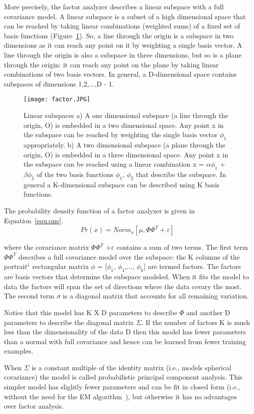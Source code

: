 \documentclass[10pt,twocolumn,letterpaper]{article}
\begin{document}
More precisely, the factor analyzer describes a linear subspace with a full covariance model. A linear subspace is a subset of a high dimensional space that can be reached by taking linear combinations (weighted sums) of a fixed set of basis functions (Figure~\ref{fig:onecol}). So, a line through the origin is a subspace in two dimensions as it can reach any point on it by weighting a single basis vector. A line through the origin is also a subspace in three dimensions, but so is a plane through the origin: it can reach any point on the plane by taking linear combinations of two basis vectors. In general, a D-dimensional space contains subspaces of dimensions 1,2,...,D - 1.
\begin{figure}[H]
\centering
\texttt{[image: factor.JPG]}
 \caption{Linear subspaces a) A one dimensional subspace (a line through the origin, O) is embedded in a two dimensional space. Any point x in the subspace can be reached by weighting the single basis vector $\phi_1$ appropriately. b) A two dimensional subspace (a plane through the origin, O) is embedded in a three dimensional space. Any point x in the subspace can be reached using a linear combination x = $\alpha\phi_1$ + $\beta\phi_2$ of the two basis functions $\phi_1$, $\phi_2$ that describe the subspace. In general a K-dimensional subspace can be described using K basis functions.}
\label{fig:onecol}
\end{figure}

The probability density function of a factor analyzer is given in Equation~\ref{equ:one}.
\begin{equation}\label{equ:one}
Pr(x) = Norm_x[\mu, \Phi\Phi^T +\varepsilon]
\end{equation}

where the covariance matrix $\Phi$$\Phi^T$ +$\varepsilon$ contains a sum of two terms. The first term $\Phi$$\Phi^T$ describes a full covariance model over the subspace: the K columns of the portrai$t^1$ rectangular matrix $\phi$ = [$\phi_1$, $\phi_1$,..., $\phi_k$] are termed factors. The factors are basis vectors that determine the subspace modeled. When it fits the model to data the factors will span the set of directions where the data covary the most. The second term $\sigma$ is a diagonal matrix that accounts for all remaining variation.

Notice that this model has K X D parameters to describe $\Phi$ and another D parameters to describe the diagonal matrix $\Sigma$. If the number of factors K is much less than the dimensionality of the data D then this model has fewer parameters than a normal with full covariance and hence can be learned from fewer training examples.

When $\Sigma$ is a constant multiple of the identity matrix (i.e., models spherical covariance) the model is called probabilistic principal component analysis. This simpler model has slightly fewer parameters and can be fit in closed form (i.e., without the need for the EM algorithm~\cite{DebashisKushary1997The}), but otherwise it has no advantages over factor analysis.


{\small


}
\end{document}
